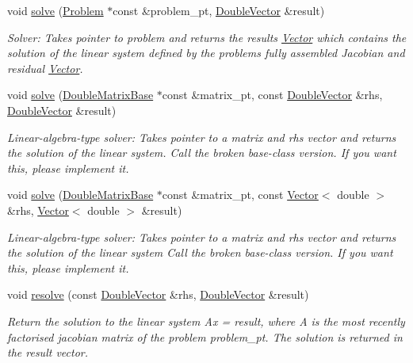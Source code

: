 \begin{DoxyCompactItemize}
void \hyperlink{classoomph_1_1HSL__MA42_ae796a6b14c13d1cdb7bf49ca3c7c5aec}{solve} (\hyperlink{classoomph_1_1Problem}{Problem} $\ast$const \&problem\+\_\+pt, \hyperlink{classoomph_1_1DoubleVector}{Double\+Vector} \&result)
\begin{DoxyCompactList}\small\item\em Solver\+: Takes pointer to problem and returns the results \hyperlink{classoomph_1_1Vector}{Vector} which contains the solution of the linear system defined by the problem\textquotesingle{}s fully assembled Jacobian and residual \hyperlink{classoomph_1_1Vector}{Vector}. \end{DoxyCompactList}\item 
void \hyperlink{classoomph_1_1HSL__MA42_a6b070c607e2e5f6af4881428d07a6423}{solve} (\hyperlink{classoomph_1_1DoubleMatrixBase}{Double\+Matrix\+Base} $\ast$const \&matrix\+\_\+pt, const \hyperlink{classoomph_1_1DoubleVector}{Double\+Vector} \&rhs, \hyperlink{classoomph_1_1DoubleVector}{Double\+Vector} \&result)
\begin{DoxyCompactList}\small\item\em Linear-\/algebra-\/type solver\+: Takes pointer to a matrix and rhs vector and returns the solution of the linear system. Call the broken base-\/class version. If you want this, please implement it. \end{DoxyCompactList}\item 
void \hyperlink{classoomph_1_1HSL__MA42_ad8f7434a5b1391751ac513c7dc1acc77}{solve} (\hyperlink{classoomph_1_1DoubleMatrixBase}{Double\+Matrix\+Base} $\ast$const \&matrix\+\_\+pt, const \hyperlink{classoomph_1_1Vector}{Vector}$<$ double $>$ \&rhs, \hyperlink{classoomph_1_1Vector}{Vector}$<$ double $>$ \&result)
\begin{DoxyCompactList}\small\item\em Linear-\/algebra-\/type solver\+: Takes pointer to a matrix and rhs vector and returns the solution of the linear system Call the broken base-\/class version. If you want this, please implement it. \end{DoxyCompactList}\item 
void \hyperlink{classoomph_1_1HSL__MA42_ad59ac679b479c977c8611065c5bea91b}{resolve} (const \hyperlink{classoomph_1_1DoubleVector}{Double\+Vector} \&rhs, \hyperlink{classoomph_1_1DoubleVector}{Double\+Vector} \&result)
\begin{DoxyCompactList}\small\item\em Return the solution to the linear system Ax = result, where A is the most recently factorised jacobian matrix of the problem problem\+\_\+pt. The solution is returned in the result vector. \end{DoxyCompactList}\item 

\end{DoxyCompactItemize}
